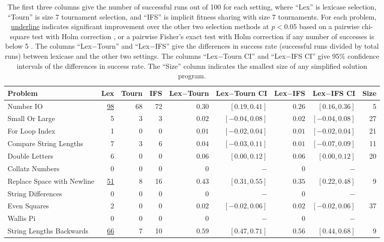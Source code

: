 \documentclass{sig-alternate}
\begin{document}
\begin{table*}[t]
\centering
\caption{The first three columns give the number of successful runs out of 100 for each setting, where ``Lex'' is lexicase selection, ``Tourn'' is size 7 tournament selection, and ``IFS'' is implicit fitness sharing with size 7 tournaments. For each problem, \underline{underline} indicates significant improvement over the other two selection methods at $p < 0.05$ based on a pairwise chi-square test with Holm correction \cite{R}, or a pairwise Fisher's exact test with Holm correction if any number of successes is below 5 \cite{fmsb}. The columns ``Lex$-$Tourn'' and ``Lex$-$IFS'' give the differences in success rate (successful runs divided by total runs) between lexicase and the other two settings. The columns ``Lex$-$Tourn CI'' and ``Lex$-$IFS CI'' give 95\% confidence intervals of the differences in success rate. The ``Size'' column indicates the smallest size of any simplified solution program.}
\label{tableResults}
\begin{tabular}{>{\raggedright}m{3.7cm} rrr|rrrr|r}
\toprule
\textbf{Problem} & \textbf{Lex} & \textbf{Tourn} & \textbf{IFS} & \textbf{Lex$-$Tourn} & \textbf{Lex$-$Tourn CI} & \textbf{Lex$-$IFS} & \textbf{Lex$-$IFS CI} & \textbf{Size} \tabularnewline
\midrule
Number IO  & \underline{98}                 & 68      & 72  & $0.30$ & $[0.19, 0.41]$ & $0.26$ & $[0.16, 0.36]$ & 5 \tabularnewline
Small Or Large  & 5            & 3       & 3           & $0.02$ & $[-0.04, 0.08]$ & $0.02$ & $[-0.04, 0.08]$ & 27 \tabularnewline
For Loop Index  & 1            & 0       & 0        & $0.01$ & $[-0.02, 0.04]$ & $0.01$ & $[-0.02, 0.04]$ & 21 \tabularnewline
Compare String Lengths  & 7     & 3       & 6       & $0.04$ & $[-0.03, 0.11]$ & $0.01$ & $[-0.07, 0.09]$ & 11 \tabularnewline
Double Letters   & 6           & 0       & 0    & $0.06$ & $[0.00, 0.12]$ & $0.06$ & $[0.00, 0.12]$ & 20 \tabularnewline
Collatz Numbers    & 0          & 0       & 0         &   $0$ & $-$ & $0$ & $-$ &  \tabularnewline
Replace Space with Newline & \underline{51} & 8       & 16        & $0.43$ & $[0.31, 0.55]$ & $0.35$ & $[0.22, 0.48]$ & 9 \tabularnewline
String Differences         & 0       & 0   & 0        & $0$ & $-$ & $0$ & $-$ &  \tabularnewline
Even Squares  & 2              & 0       & 0          & $0.02$ & $[-0.02, 0.06]$ & $0.02$ & $[-0.02, 0.06]$ & 37 \tabularnewline
Wallis Pi                  & 0       & 0   & 0        &   $0$ & $-$ & $0$ & $-$ &  \tabularnewline
String Lengths Backwards & \underline{66}   & 7       & 10        & $0.59$ & $[0.47, 0.71]$ & $0.56$ & $[0.44, 0.68]$ & 9 \tabularnewline

\end{tabular}
\end{table*}
\end{document}
